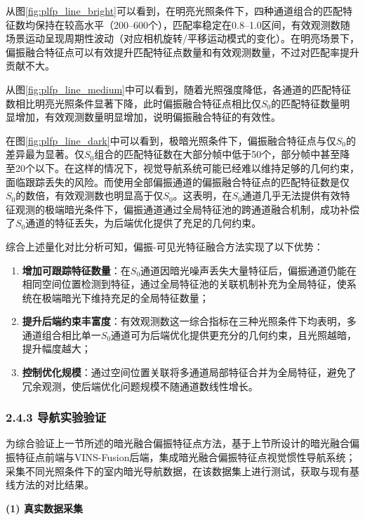 从图\ref{fig:plfp_line_bright}可以看到，在明亮光照条件下，四种通道组合的匹配特征数均保持在较高水平（200--600个），匹配率稳定在0.8--1.0区间，有效观测数随场景运动呈现周期性波动（对应相机旋转/平移运动模式的变化）。在明亮场景下，偏振融合特征点可以有效提升匹配特征点数量和有效观测数量，不过对匹配率提升贡献不大。

从图\ref{fig:plfp_line_medium}中可以看到，随着光照强度降低，各通道的匹配特征数相比明亮光照条件显著下降，此时偏振融合特征点相比仅$S_0$的匹配特征数量明显增加，有效观测数量明显增加，说明偏振融合特征的有效性。


在图\ref{fig:plfp_line_dark}中可以看到，极暗光照条件下，偏振融合特征点与仅$S_0$的差异最为显著。仅$S_0$组合的匹配特征数在大部分帧中低于50个，部分帧中甚至降至20个以下。在这样的情况下，视觉导航系统可能已经难以维持足够的几何约束，面临跟踪丢失的风险。而使用全部偏振通道的偏振融合特征点的匹配特征数是仅$S_0$的数倍，有效观测数也明显高于仅$S_0$。这表明，在$S_0$通道几乎无法提供有效特征观测的极端暗光条件下，偏振通道通过全局特征池的跨通道融合机制，成功补偿了$S_0$通道的特征丢失，为后端优化提供了充足的几何约束。

综合上述量化对比分析可知，偏振-可见光特征融合方法实现了以下优势：

\begin{enumerate}
    \item \textbf{增加可跟踪特征数量}：在$S_0$通道因暗光噪声丢失大量特征后，偏振通道仍能在相同空间位置检测到特征，通过全局特征池的关联机制补充为全局特征，使系统在极端暗光下维持充足的全局特征数量；
    \item \textbf{提升后端约束丰富度}：有效观测数这一综合指标在三种光照条件下均表明，多通道组合相比单一$S_0$通道可为后端优化提供更充分的几何约束，且光照越暗，提升幅度越大；
    \item \textbf{控制优化规模}：通过空间位置关联将多通道局部特征合并为全局特征，避免了冗余观测，使后端优化问题规模不随通道数线性增长。
\end{enumerate}

\subsubsection*{2.4.3 导航实验验证}

为综合验证上一节所述的暗光融合偏振特征点方法，基于上节所设计的暗光融合偏振特征点前端与VINS-Fusion后端，集成暗光融合偏振特征点视觉惯性导航系统；采集不同光照条件下的室内暗光导航数据，在该数据集上进行测试，获取与现有基线方法的对比结果。

\textbf{(1) 真实数据采集}

